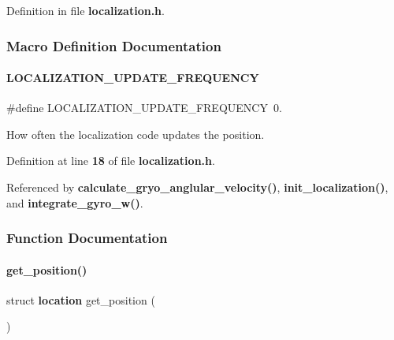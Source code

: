 Definition in file \textbf{ localization.\+h}.



\subsubsection{Macro Definition Documentation}
\mbox{\label{localization_8h_a4fa0a97f6aafe983a46ffc7188d1fab5}} 
\paragraph{L\+O\+C\+A\+L\+I\+Z\+A\+T\+I\+O\+N\+\_\+\+U\+P\+D\+A\+T\+E\+\_\+\+F\+R\+E\+Q\+U\+E\+N\+CY}
{\footnotesize\ttfamily \#define L\+O\+C\+A\+L\+I\+Z\+A\+T\+I\+O\+N\+\_\+\+U\+P\+D\+A\+T\+E\+\_\+\+F\+R\+E\+Q\+U\+E\+N\+CY~0.}

How often the localization code updates the position. 

Definition at line \textbf{ 18} of file \textbf{ localization.\+h}.



Referenced by \textbf{ calculate\+\_\+gryo\+\_\+anglular\+\_\+velocity()}, \textbf{ init\+\_\+localization()}, and \textbf{ integrate\+\_\+gyro\+\_\+w()}.



\subsubsection{Function Documentation}
\mbox{\label{localization_8h_aadbff35bb757f60bc348d4d778f57a2f}} 
\paragraph{get\+\_\+position()}
{\footnotesize\ttfamily struct \textbf{ location} get\+\_\+position (\begin{DoxyParamCaption}{ }\end{DoxyParamCaption})}




